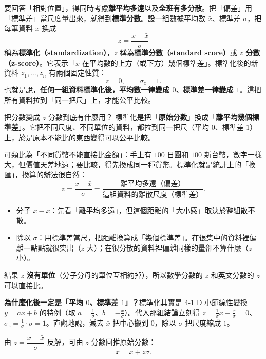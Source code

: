 \documentclass[11pt]{article}
\begin{document}
要回答「相對位置」，得同時考慮\textbf{離平均多遠}以及\textbf{全班有多分散}。把「偏差」用「標準差」當尺度量出來，就得到\textbf{標準分數}。設一組數據平均數 $\bar{x}$、標準差 $\sigma$，把每筆資料 $x$ 換成
$$\boxed{\;z = \frac{x - \bar{x}}{\sigma}\;}$$
稱為\textbf{標準化（standardization）}，$z$ 稱為\textbf{標準分數（standard score）}或 \textbf{$z$ 分數（z-score）}。它表示「$x$ 在平均數的上方（或下方）幾個標準差」。標準化後的新資料 $z_1,\dots,z_n$ 有兩個固定性質：
$$\bar{z}=0,\qquad \sigma_z = 1.$$
也就是說，\textbf{任何一組資料標準化後，平均數一律變成 $0$、標準差一律變成 $1$}。這把所有資料拉到「同一把尺」上，才能公平比較。

\begin{補充框}{把分數變成 $z$ 分數到底有什麼用？}
標準化是把「\textbf{原始分數}」換成「\textbf{離平均幾個標準差}」。它把不同尺度、不同單位的資料，都拉到同一把尺（平均 $0$、標準差 $1$）上，於是原本不能比的東西變得可以公平比較。

可類比為「不同貨幣不能直接比金額」：手上有 $100$ 日圓和 $100$ 新台幣，數字一樣大，但價值天差地遠；要比較，得先換成同一種貨幣。標準化就是統計上的「換匯」，換算的辦法很自然：
$$z = \frac{x-\bar x}{\sigma} = \frac{\text{離平均多遠（偏差）}}{\text{這組資料的離散尺度（標準差）}}.$$
\begin{itemize}\setlength{\itemsep}{1pt}
\item 分子 $x-\bar x$：先看「離平均多遠」，但這個距離的「大小感」取決於整組散不散。
\item 除以 $\sigma$：用標準差當尺，把距離換算成「幾個標準差」。在很集中的資料裡偏離一點點就很突出（$z$ 大）；在很分散的資料裡偏離同樣的量卻不算什麼（$z$ 小）。
\end{itemize}
結果 $z$ \textbf{沒有單位}（分子分母的單位互相約掉），所以數學分數的 $z$ 和英文分數的 $z$ 可以直接比。

\textbf{為什麼化後一定是「平均 $0$、標準差 $1$」？}標準化其實是 4-1 D 小節線性變換 $y=ax+b$ 的特例（取 $a=\frac{1}{\sigma}$、$b=-\frac{\bar x}{\sigma}$）。代入那組結論立刻得 $\bar z=\frac{1}{\sigma}\bar x-\frac{\bar x}{\sigma}=0$、$\sigma_z=\frac{1}{\sigma}\cdot\sigma=1$。直觀地說，減去 $\bar x$ 把中心搬到 $0$，除以 $\sigma$ 把尺度縮成 $1$。
\end{補充框}


由 $z=\dfrac{x-\bar{x}}{\sigma}$ 反解，可由 $z$ 分數回推原始分數：
$$x = \bar{x} + z\sigma.$$
\end{document}
